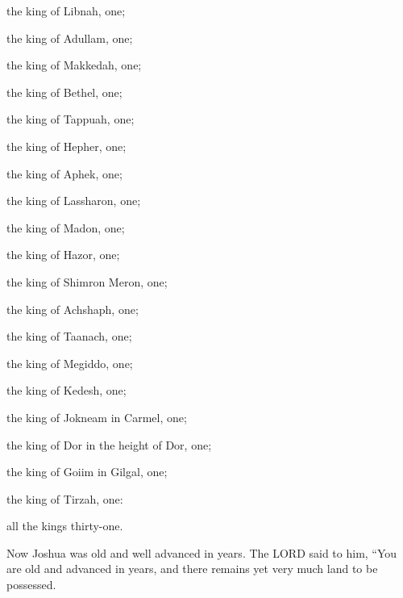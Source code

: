 \myverse{}the king of Libnah, one;

the king of Adullam, one;

\myverse{}the king of Makkedah, one;

the king of Bethel, one;

\myverse{}the king of Tappuah, one;

the king of Hepher, one;

\myverse{}the king of Aphek, one;

the king of Lassharon, one;

\myverse{}the king of Madon, one;

the king of Hazor, one;

\myverse{}the king of Shimron Meron, one;

the king of Achshaph, one;

\myverse{}the king of Taanach, one;

the king of Megiddo, one;

\myverse{}the king of Kedesh, one;

the king of Jokneam in Carmel, one;

\myverse{}the king of Dor in the height of Dor, one;

the king of Goiim in Gilgal, one;

\myverse{}the king of Tirzah, one:

all the kings thirty-one.


\mychapter{} \myverse*{}Now Joshua was old and well advanced in years. The LORD said to
him, “You are old and advanced in years, and there remains yet very much land to be possessed.

